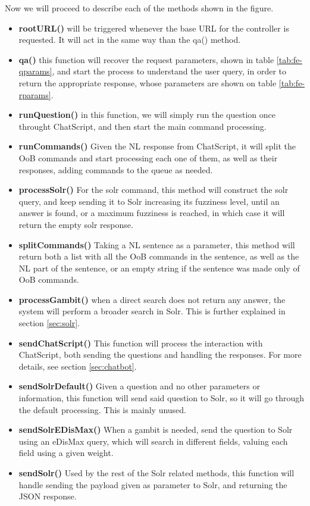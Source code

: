 Now we will proceed to describe each of the methods shown in the figure.

\begin{itemize}
  \item \textbf{rootURL()} will be triggered whenever the base URL for the controller is requested. It will act in the same way than the qa() method.
  \item \textbf{qa()} this function will recover the request parameters, shown in table \ref{tab:fe-qparams}, and start the process to understand the user query, in order to return the appropriate response, whose parameters are shown on table \ref{tab:fe-rparams}.
  \item \textbf{runQuestion()} in this function, we will simply run the question once throught ChatScript, and then start the main command processing.
  \item \textbf{runCommands()} Given the \ac{NL} response from ChatScript, it will split the \ac{OoB} commands and start processing each one of them, as well as their responses, adding commands to the queue as needed.
  \item \textbf{processSolr()} For the solr command, this method will construct the solr query, and keep sending it to Solr increasing its fuzziness level, until an answer is found, or a maximum fuzziness is reached, in which case it will return the empty solr response.
  \item \textbf{splitCommands()} Taking a \ac{NL} sentence as a parameter, this method will return both a list with all the \ac{OoB} commands in the sentence, as well as the \ac{NL} part of the sentence, or an empty string if the sentence was made only of \ac{OoB} commands. 
  \item \textbf{processGambit()} when a direct search does not return any answer, the system will perform a broader search in Solr. This is further explained in section \ref{sec:solr}.
  \item \textbf{sendChatScript()} This function will process the interaction with ChatScript, both sending the questions and handling the responses. For more details, see section \ref{sec:chatbot}.
  \item \textbf{sendSolrDefault()} Given a question and no other parameters or information, this function will send said question to Solr, so it will go through the default processing. This is mainly unused.
  \item \textbf{sendSolrEDisMax()} When a gambit is needed, send the question to Solr using an eDisMax query, which will search in different fields, valuing each field using a given weight. 
  \item \textbf{sendSolr()} Used by the rest of the Solr related methods, this function will handle sending the payload given as parameter to Solr, and returning the JSON response.
\end{itemize}

